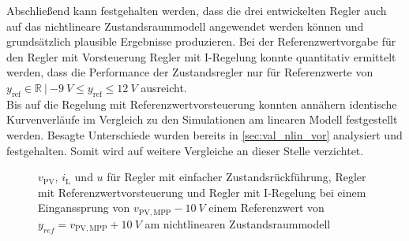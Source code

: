 Abschließend kann festgehalten werden, dass die drei entwickelten Regler auch auf das nichtlineare Zustandsraummodell angewendet werden können und grundsätzlich plausible Ergebnisse produzieren. Bei der Referenzwertvorgabe für den Regler mit Vorsteuerung \bzw Regler mit I-Regelung konnte quantitativ ermittelt werden, dass die Performance der Zustandsregler nur für Referenzwerte von $y_{\mathrm{ref}} \in \mathbb{R} \: | \: \SI{-9}{V} \leq y_{\mathrm{ref}} \leq \SI{+12}{V}$ ausreicht. \\
Bis auf die Regelung mit Referenzwertvorsteuerung konnten annähern identische Kurvenverläufe im Vergleich zu den Simulationen am linearen Modell festgestellt werden. Besagte Unterschiede wurden bereits in \autoref{sec:val_nlin_vor} analysiert und festgehalten. Somit wird auf weitere Vergleiche an dieser Stelle verzichtet.

\begin{figure}[H]
    \centering
    \caption[Reglervergleich für das nichtlineare Zustandsraummodell]{$v_{\mathrm{PV}}$, $i_{\mathrm{L}}$ und $u$ für Regler mit einfacher Zustandsrückführung, Regler mit Referenzwertvorsteuerung und Regler mit I-Regelung bei einem Einganssprung von $v_{\mathrm{PV,MPP}} - \SI{10}{V}$ \bzw einem Referenzwert von $y_{ref} = v_{\mathrm{PV,MPP}} + \SI{10}{V}$ am nichtlinearen Zustandsraummodell}
    \label{fig:Bild26}
\end{figure}